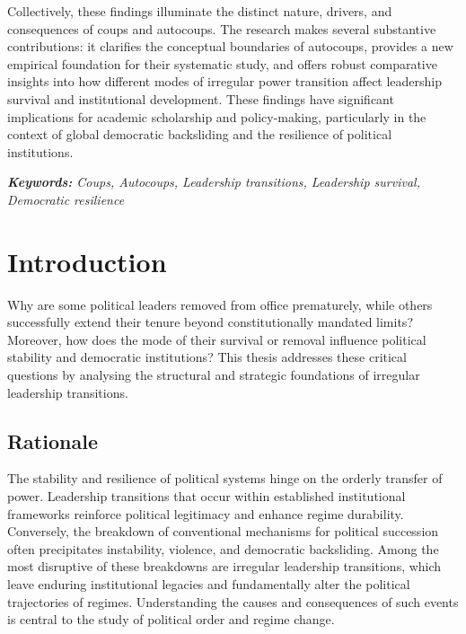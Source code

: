 \documentclass[
  12pt,
]{report}
\begin{document}
Collectively, these findings illuminate the distinct nature, drivers,
and consequences of coups and autocoups. The research makes several
substantive contributions: it clarifies the conceptual boundaries of
autocoups, provides a new empirical foundation for their systematic
study, and offers robust comparative insights into how different modes
of irregular power transition affect leadership survival and
institutional development. These findings have significant implications
for academic scholarship and policy-making, particularly in the context
of global democratic backsliding and the resilience of political
institutions.

\emph{\textbf{Keywords:} Coups, Autocoups, Leadership transitions,
Leadership survival, Democratic resilience}

\chapter{Introduction}\label{introduction}

Why are some political leaders removed from office prematurely, while
others successfully extend their tenure beyond constitutionally mandated
limits? Moreover, how does the mode of their survival or removal
influence political stability and democratic institutions? This thesis
addresses these critical questions by analysing the structural and
strategic foundations of irregular leadership transitions.

\section{Rationale}\label{rationale}

The stability and resilience of political systems hinge on the orderly
transfer of power. Leadership transitions that occur within established
institutional frameworks reinforce political legitimacy and enhance
regime durability. Conversely, the breakdown of conventional mechanisms
for political succession often precipitates instability, violence, and
democratic backsliding. Among the most disruptive of these breakdowns
are irregular leadership transitions, which leave enduring institutional
legacies and fundamentally alter the political trajectories of regimes.
Understanding the causes and consequences of such events is central to
the study of political order and regime change.
\end{document}
